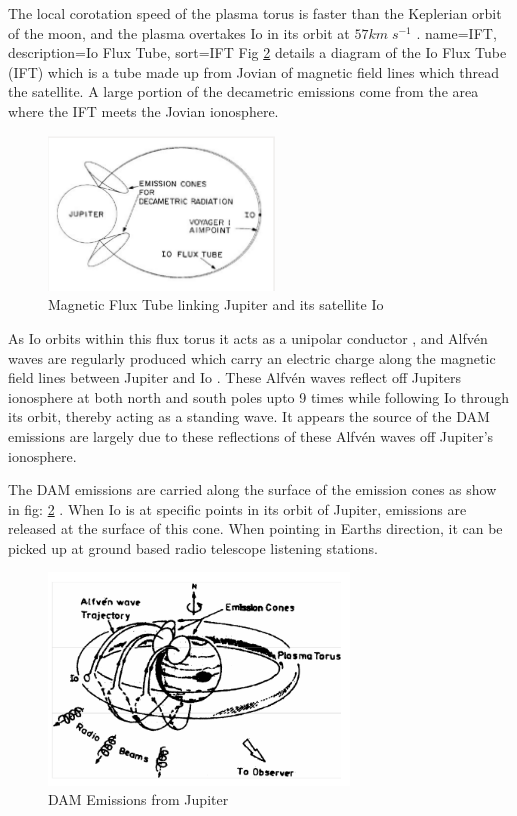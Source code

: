 \documentclass[runningheads,a4paper]{llncs}
\begin{document}
The local corotation speed of the plasma torus is faster than the Keplerian orbit of the moon, and the plasma overtakes Io in its orbit at \begin{math} 57 km\;s^{-1} \end{math} \citep{belcher87}.
%
{
  name={IFT},
  description={Io Flux Tube},
  sort=IFT
}
%
Fig \ref{fig:io_flux_tube} details a diagram of the Io Flux Tube (\gls{IFT}) which is a tube made up from Jovian of magnetic field lines \citep{belcher87} which thread the satellite. A large portion of the decametric emissions come from the area where the \gls{IFT} meets the Jovian ionosphere. 
%
\begin{figure}[here]
\centering
\includegraphics[width=6cm]{images/03}
\caption{Magnetic Flux Tube linking Jupiter and its satellite Io \citep{belcher87}}
\label{fig:io_flux_tube}
\end{figure}
%
As Io orbits within this flux torus it acts as a unipolar conductor \citep{bose08}, and Alfv\'en waves are regularly produced which carry an electric charge along the magnetic field lines between Jupiter and Io \citep{bose08}. These Alfv\'en waves reflect off Jupiters ionosphere at both north and south poles upto 9 times \citep{bose08} while following Io through its orbit, thereby acting as a standing wave. It appears the source of the \gls{DAM} emissions are largely due to these reflections of these Alfv\'en waves off Jupiter's ionosphere.

The \gls{DAM} emissions are carried along the surface of the emission cones as show in fig: \ref{fig:io_flux_tube} \citep{belcher87}. When Io is at specific points in its orbit of Jupiter, emissions are released at the surface of this cone. When pointing in Earths direction, it can be picked up at ground based radio telescope listening stations.

%
\begin{figure}[here]
\centering
\includegraphics[width=8cm]{images/04}
\caption{DAM Emissions from Jupiter \citep{bose08}}
\label{fig:io_flux_tube}
\end{figure}
%
\end{document}
